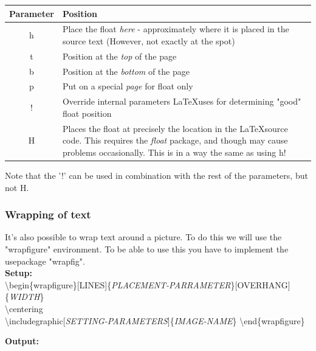 \documentclass{article}
\newcommand{\bs}[1]{\textbackslash{}#1} %
\begin{document}
\begin{table}[h]
    \centering
    \begin{tabular}{|c|p{5in}|} \hline
        \rowcolor{gray!30}
        Parameter & Position \\ \hline
        h & Place the float \textit{here} - approximately where it is placed in the source text (However, not exactly at the spot) \\ \hline
        t & Position at the \textit{top} of the page \\ \hline
        b & Position at the \textit{bottom} of the page \\ \hline
        p & Put on a special \textit{page} for float only \\ \hline
        ! & Override internal parameters \LaTeX uses for determining "good" float position \\ \hline
        H & Places the float at precisely the location in the \LaTeX source code. This requires the \textit{float} package,
        and though may cause problems occasionally. This is in a way the same as using h! \\ \hline
    \end{tabular}
\end{table} %

Note that the '!' can be used in combination with the rest of the parameters, but not H.

\subsubsection{Wrapping of text} \label{secc:image_wrapping}
It's also possible to wrap text around a picture. To do this we will use the "wrapfigure" environment. 
To be able to use this you have to implement the usepackage "wrapfig". \\



\vspace{0.75em}
{\large\textbf{Setup:}} \\
\bs{begin\{wrapfigure\}[LINES]\{\textit{PLACEMENT-PARRAMETER}\}[OVERHANG]\{\textit{WIDTH}\}} \\
    \bs{centering} \\
    \bs{includegraphic[\textit{SETTING-PARAMETERS}]\{\textit{IMAGE-NAME}\}}
\bs{end\{wrapfigure\}} \\


\vspace{1.25em}

{\large\textbf{Output:}}
\end{document}
